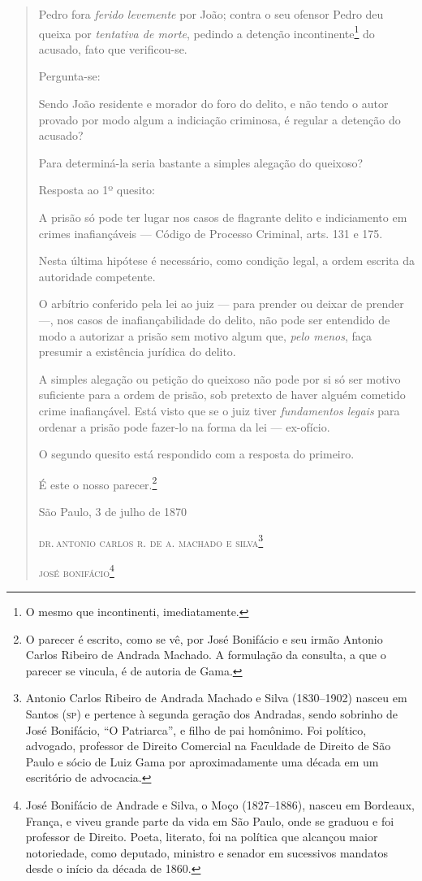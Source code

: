 \begin{quote}
Pedro fora \emph{ferido levemente} por João; contra o seu ofensor Pedro
deu queixa por \emph{tentativa de morte}, pedindo a detenção
incontinente\footnote{ O mesmo que incontinenti, imediatamente.} do
acusado, fato que verificou-se.

Pergunta-se:

Sendo João residente e morador do foro do delito, e não tendo o autor
provado por modo algum a indiciação criminosa, é regular a detenção do
acusado?

Para determiná-la seria bastante a simples alegação do queixoso?

Resposta ao 1º quesito:

A prisão só pode ter lugar nos casos de flagrante delito e indiciamento
em crimes inafiançáveis --- Código de Processo Criminal, arts. 131 e 175.

Nesta última hipótese é necessário, como condição legal, a ordem escrita
da autoridade competente.

O arbítrio conferido pela lei ao juiz --- para prender ou deixar de
prender ---, nos casos de inafiançabilidade do delito, não pode ser
entendido de modo a autorizar a prisão sem motivo algum que, \emph{pelo
menos}, faça presumir a existência jurídica do delito.

A simples alegação ou petição do queixoso não pode por si só ser motivo
suficiente para a ordem de prisão, sob pretexto de haver alguém cometido
crime inafiançável. Está visto que se o juiz tiver \emph{fundamentos
legais} para ordenar a prisão pode fazer-lo na forma da lei ---
ex-ofício.

O segundo quesito está respondido com a resposta do primeiro.

É este o nosso parecer.\footnote{ O parecer é escrito, como se vê, por
  José Bonifácio e seu irmão Antonio Carlos Ribeiro de Andrada Machado.
  A formulação da consulta, a que o parecer se vincula, é de autoria de
  Gama.}

\begin{flushright}
São Paulo, 3 de julho de 1870

\textsc{dr.\,antonio carlos r. de a. machado e silva}\footnote{ Antonio
  Carlos Ribeiro de Andrada Machado e Silva (1830--1902) nasceu em Santos
  (\textsc{sp}) e pertence à segunda geração dos Andradas, sendo sobrinho de José
  Bonifácio, ``O Patriarca'', e filho de pai homônimo. Foi político,
  advogado, professor de Direito Comercial na Faculdade de Direito de
  São Paulo e sócio de Luiz Gama por aproximadamente uma década em um
  escritório de advocacia.}

\textsc{josé bonifácio}\footnote{ José Bonifácio de Andrade e Silva, o
  Moço (1827--1886), nasceu em Bordeaux, França, e viveu grande parte da
  vida em São Paulo, onde se graduou e foi professor de Direito. Poeta,
  literato, foi na política que alcançou maior notoriedade, como
  deputado, ministro e senador em sucessivos mandatos desde o início da
  década de 1860.}
\end{flushright}
\end{quote}

